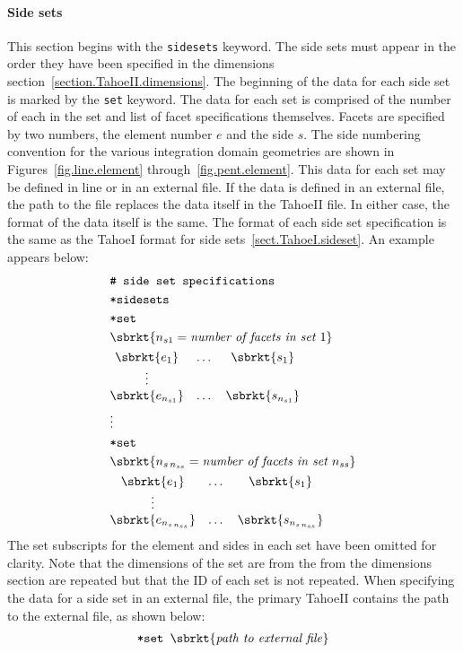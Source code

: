 \paragraph{Side sets}
This section begins with the \texttt{sidesets} keyword.
The side sets must appear in the order they have been specified in 
the dimensions section~\ref{section.TahoeII.dimensions}. The 
beginning of the data for each side set is marked by the \texttt{set} 
keyword. The data for each set is comprised of the number of each in 
the set and list of facet specifications themselves. 
Facets are specified by two numbers, the element number $e$ and the
side $s$. The side numbering convention for the various integration 
domain geometries are shown in Figures~\ref{fig.line.element} 
through~\ref{fig.pent.element}.
This data for each set may be 
defined in line or in an external file. If the data is defined in an 
external file, the path to the file replaces the data itself in the 
TahoeII file. In either case, the format of the data itself is the 
same. The format of each side set specification is the same as the TahoeI 
format for side sets~\ref{sect.TahoeI.sideset}. An example appears 
below:
\begin{align}
& \texttt{\# side set specifications} \notag \\
& \texttt{*sidesets} \notag \\
& \texttt{*set} \notag \\
& \sbrkt{n_{s1} = \textit{number of facets in set~}1} \notag \\
& \begin{matrix}
\sbrkt{e_{1}} & \dots  & \sbrkt{s_{1}} \\
\vdots \\
\sbrkt{e_{n_{s1}}} & \dots  & \sbrkt{s_{n_{s1}}}
\end{matrix} \notag \\
& \vdots \notag \\
& \texttt{*set} \notag \\
& \sbrkt{n_{s\,n_{ss}} = \textit{number of facets in set~}n_{ss}} \notag \\
& \begin{matrix}
\sbrkt{e_{1}} & \dots  & \sbrkt{s_{1}} \\
\vdots \\
\sbrkt{e_{n_{s\,n_{ss}}}} & \dots  & \sbrkt{s_{n_{s\,n_{ss}}}}
\end{matrix} \notag
\end{align}
The set subscripts for the element and sides in each set have been
omitted for clarity.
Note that the dimensions of the set are from the from the dimensions 
section are repeated but that the ID of each set is not repeated.
When specifying the data for a side set in an external file, the 
primary TahoeII contains the path to the external file, as shown below:
\begin{align}
\texttt{*set~} \sbrkt{\textrm{\textit{path to external file}}}
\end{align}


